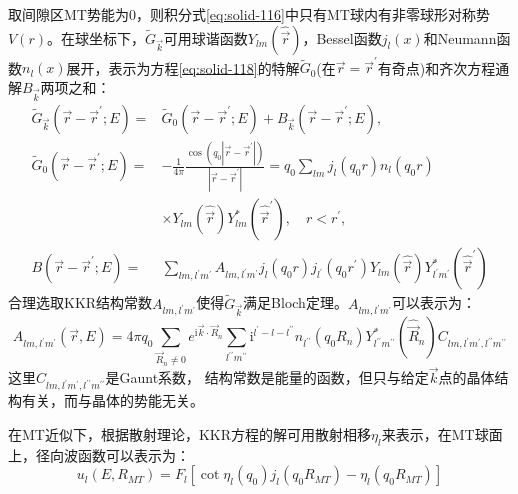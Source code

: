 取间隙区MT势能为0，则积分式\eqref{eq:solid-116}中只有MT球内有非零球形对称势$V(r)$。在球坐标下，$\tilde G_{\vec k}$可用球谐函数$Y_{lm}(\hat{\vec r})$，Bessel函数$j_l(x)$和Neumann函数$n_l(x)$展开，表示为方程\eqref{eq:solid-118}的特解$\tilde G_0$(在$\vec r=\vec r^{\prime}$有奇点)和齐次方程通解$B_{\vec k}$两项之和：
\begin{equation}
  \begin{split}
    \tilde G_{\vec k}(\vec r-\vec r^{\prime};E)=&\tilde G_0(\vec r-\vec r^{\prime};E)+B_{\vec k}(\vec r-\vec r^{\prime};E),\\
    \tilde G_0(\vec r-\vec r^{\prime};E)=&-\frac1{4\pi}\frac{\cos(q_0|\vec r-\vec r^{\prime}|)}{|\vec r-\vec r^{\prime}|}=q_0\sum_{lm}j_l(q_0r)n_l(q_0r)\\
    &\times Y_{lm}(\hat{\vec r})Y_{lm}^{\ast}(\hat{\vec r}^{\prime}),\quad r<r^{\prime},\\
    B(\vec r-\vec r^{\prime};E)=&\sum_{lm,l^{\prime}m^{\prime}}A_{lm,l^{\prime}m^{\prime}}j_l(q_0r)j_{l^{\prime}}(q_0r^{\prime})Y_{lm}(\hat{\vec r})Y_{l^{\prime}m^{\prime}}^{\ast}(\hat{\vec r}^{\prime})
  \end{split}
  \label{eq:solid-119}
\end{equation}
合理选取KKR结构常数$A_{lm,l^{\prime}m^{\prime}}$使得$\tilde G_{\vec k}$满足Bloch定理。$A_{lm,l^{\prime}m^{\prime}}$可以表示为\cite{MCP8-251_1968}：
\begin{equation}
	A_{lm,l^{\prime}m^{\prime}}(\vec r,E)=4\pi q_0\sum_{\vec R_n\neq0}e^{\mathrm{i}\vec k\cdot\vec R_n}\sum_{l^{\prime\prime}m^{\prime\prime}}\mathrm{i}^{l^{\prime}-l-l^{\prime\prime}}n_{l^{\prime\prime}}(q_0R_n)Y_{l^{\prime\prime}m^{\prime\prime}}^{\ast}(\hat{\vec R}_n)C_{lm,l^{\prime}m^{\prime},l^{\prime\prime}m^{\prime\prime}}
  \label{eq:solid-120}
\end{equation}
这里$C_{lm,l^{\prime}m^{\prime},l^{\prime\prime}m^{\prime\prime}}$是Gaunt系数，
结构常数是能量的函数，但只与给定$\vec k$点的晶体结构有关，而与晶体的势能无关。

在MT近似下，根据散射理论，KKR方程的解可用散射相移$\eta_l$来表示，在MT球面上，径向波函数可以表示为：
\begin{equation}
  u_l(E,R_{MT})=F_l[\cot\eta_l(q_0)j_l(q_0R_{MT})-\eta_l(q_0R_{MT})]
  \label{eq:solid-125}
\end{equation}


